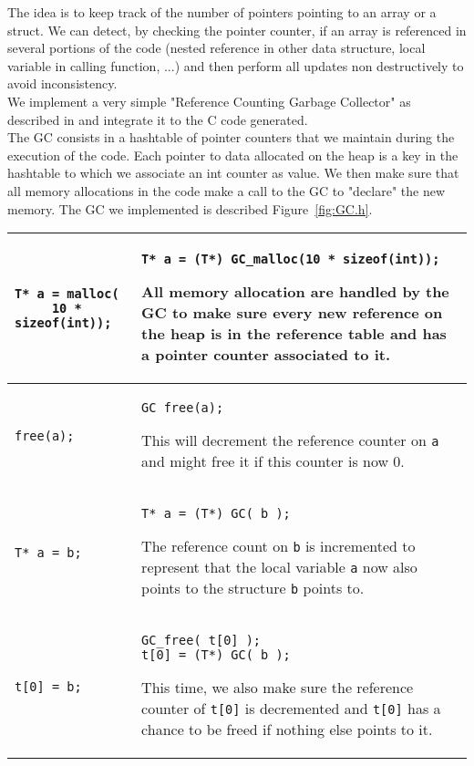 \documentclass[12pt,a4paper]{article}
\newcommand{\cl}[1]{\texttt{#1}}
\begin{document}
The idea is to keep track of the number of pointers pointing to an array or a struct. We can detect, by checking the pointer counter, if an array is referenced in several portions of the code (nested reference in other data structure, local variable in calling function, ...) and then perform all updates non destructively to avoid inconsistency.\\

We implement a very simple "Reference Counting Garbage Collector" as described in \cite{jonesgarbage} and integrate it to the C code generated.\\

The GC consists in a hashtable of pointer counters that we maintain during the execution of the code. Each pointer to data allocated on the heap is a key in the hashtable to which we associate an int counter as value. We then make sure that all memory allocations in the code make a call to the GC to "declare" the new memory. The GC we implemented is described Figure~\ref{fig:GC.h}.

\begin{tabular}{|p{5cm}|p{11cm}|}
\hline
\begin{lstlisting}
T* a = malloc(
     10 * sizeof(int));
\end{lstlisting} & \begin{lstlisting}
T* a = (T*) GC_malloc(10 * sizeof(int));
\end{lstlisting}
All memory allocation are handled by the GC to make sure every new reference on the heap is in the reference table and has a pointer counter associated to it.
\\ \hline
\begin{lstlisting}
free(a);
\end{lstlisting} & \begin{lstlisting}
GC_free(a);
\end{lstlisting}
This will decrement the reference counter on \cl{a} and might free it if this counter is now 0. \\ \hline
\begin{lstlisting}
T* a = b;
\end{lstlisting} & \begin{lstlisting}
T* a = (T*) GC( b );
\end{lstlisting}
The reference count on \cl{b} is incremented to represent that the local variable \cl{a} now also points to the structure \cl{b} points to.\\ \hline
\begin{lstlisting}
t[0] = b;
\end{lstlisting} & \begin{lstlisting}
GC_free( t[0] );
t[0] = (T*) GC( b );
\end{lstlisting}
This time, we also make sure the reference counter of \cl{t[0]} is decremented and \cl{t[0]} has a chance to be freed if nothing else points to it.\\ \hline
\end{tabular}
\end{document}
